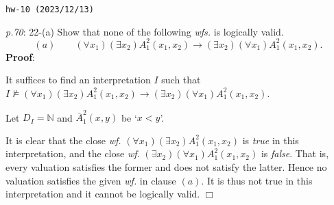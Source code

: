 \documentclass[UTF8,12pt,a4paper]{ctexart}
\begin{document}
\noindent\texttt{hw-10 (2023/12/13)}

\emph{p.70}: 22-(a) \quad
Show that none of the following \textit{wfs.} is logically valid.
\[
(a) \qquad 
(\forall x_1) (\exists x_2) A^2_1(x_1,x_2) \to (\exists x_2) (\forall x_1) A^2_1 (x_1,x_2).
\]
\textbf{Proof}:   


It suffices to find an interpretation $I$ such that $I \not \models (\forall x_1) (\exists x_2) A^2_1(x_1,x_2) \to (\exists x_2) (\forall x_1) A^2_1 (x_1,x_2)$.

Let $D_I=\mathbb{N}$ and $\bar{A}^2_1(x,y)$ be `$x < y$'. 


It is clear that the close \textit{wf.} $(\forall x_1) (\exists x_2) A^2_1(x_1,x_2)$ is \textit{true} in this interpretation, 
and the close \textit{wf.} 
$(\exists x_2) (\forall x_1) A^2_1 (x_1,x_2)$ is \textit{false}. 
That is, every valuation satisfies the former and does not satisfy the latter. 
Hence no valuation satisfies the given \textit{wf.} in clause $(a)$. 
It is thus not true in this interpretation and it cannot be logically valid.
\hfill $\Box$







\end{document}
